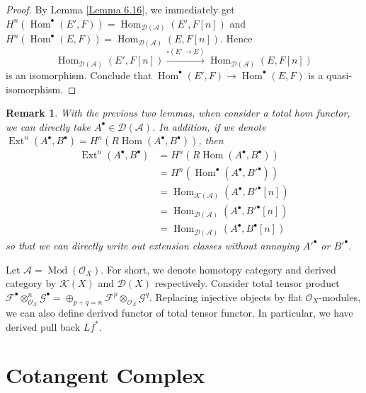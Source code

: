 \documentclass{ctexart}
\newtheorem{remark}{Remark}[section]
\renewcommand{\hom}{\operatorname{Hom}}
\newcommand{\ext}{\operatorname{Ext}}
\newcommand{\module}{\operatorname{Mod}}
\begin{document}
\begin{proof}
    By Lemma \ref{Lemma 6.16}, we immediately get $H^{n}(\hom^{\bullet}(E', F)) = \hom_{\mathcal{D}(\mathscr{A})}(E', F[n])$ and $H^{n}(\hom^{\bullet}(E, F)) = \hom_{\mathcal{D}(\mathscr{A})}(E, F[n])$.
    Hence 
    \begin{equation}
        \hom_{\mathcal{D}(\mathscr{A})}(E', F[n]) \overset{\circ (E' \rightarrow E)}{\longrightarrow} \hom_{\mathcal{D}(\mathscr{A})}(E, F[n])
    \end{equation}
    is an isomorphism.
    Conclude that $\hom^{\bullet}(E', F) \rightarrow \hom^{\bullet}(E, F)$ is a quasi-isomorphism.
\end{proof}
\begin{remark}
    With the previous two lemmas, when consider a total hom functor, we can directly take $A^{\bullet}\in \mathcal{D}(\mathscr{A})$.
    In addition, if we denote $\ext^{n}(A^{\bullet}, B^{\bullet}) = H^{n}(R\hom(A^{\bullet}, B^{\bullet}))$, then
    \begin{equation}
        \begin{split}
            \ext^{n}(A^{\bullet}, B^{\bullet}) & = H^{n}(R\hom(A^{\bullet}, B^{\bullet})) \\
            & = H^{n}(\hom^{\bullet}(A^{\bullet}, B'^{\bullet})) \\
            & = \hom_{\mathcal{K}(\mathscr{A})}(A^{\bullet}, B'^{\bullet}[n]) \\
            & = \hom_{\mathcal{D}(\mathscr{A})}(A^{\bullet}, B'^{\bullet}[n]) \\
            & = \hom_{\mathcal{D}(\mathscr{A})}(A^{\bullet}, B^{\bullet}[n])
        \end{split}
    \end{equation}
    so that we can directly write out extension classes without annoying $A'^{\bullet}$ or $B'^{\bullet}$.
\end{remark}
Let $\mathscr{A} = \module(\mathcal{O}_{X})$.
For short, we denote homotopy category and derived category by $\mathcal{K}(X)$ and $\mathcal{D}(X)$ respectively.
Consider total tensor product $\mathcal{F}^{\bullet} \otimes_{\mathcal{O}_{X}}^{n} \mathcal{G}^{\bullet} = \oplus_{p + q = n} \mathcal{F}^{p} \otimes_{\mathcal{O}_{X}} \mathcal{G}^{q}$.
Replacing injective objects by flat $\mathcal{O}_{X}$-modules, 
we can also define derived functor of total tensor functor.
In particular, we have derived pull back $Lf^{\ast}$.

\section{Cotangent Complex}
\label{section:Cotangent_Complex}
\end{document}
